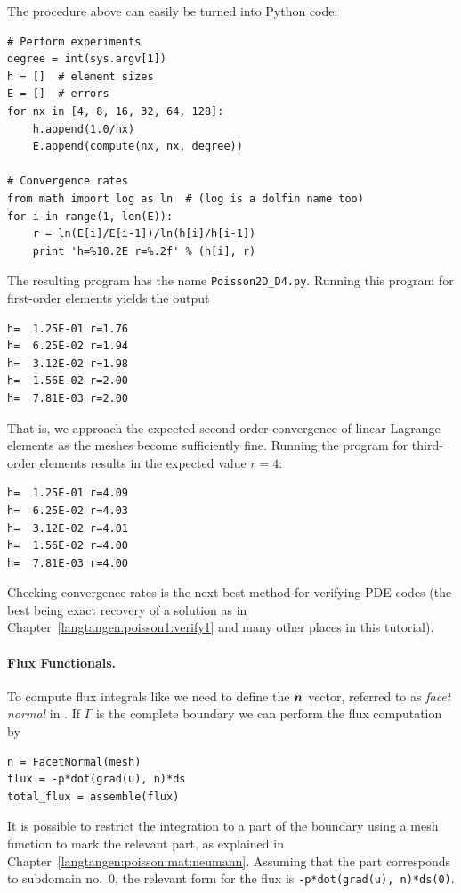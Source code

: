 The procedure above can easily be turned into Python code:
\begin{Verbatim}[fontsize=\fontsize{10pt}{10pt},tabsize=8,baselinestretch=1.05,
fontfamily=tt,xleftmargin=7mm]
# Perform experiments
degree = int(sys.argv[1])
h = []  # element sizes
E = []  # errors
for nx in [4, 8, 16, 32, 64, 128]:
    h.append(1.0/nx)
    E.append(compute(nx, nx, degree))

# Convergence rates
from math import log as ln  # (log is a dolfin name too)
for i in range(1, len(E)):
    r = ln(E[i]/E[i-1])/ln(h[i]/h[i-1])
    print 'h=%10.2E r=%.2f' % (h[i], r)
\end{Verbatim}
\noindent
The resulting program has the name {\fontsize{12pt}{12pt}\verb!Poisson2D_D4.py!}. Running this
program for first-order elements yields the output
\begin{Verbatim}[fontsize=\fontsize{10pt}{10pt},tabsize=8,baselinestretch=1.05,
fontfamily=tt,xleftmargin=7mm]
h=  1.25E-01 r=1.76
h=  6.25E-02 r=1.94
h=  3.12E-02 r=1.98
h=  1.56E-02 r=2.00
h=  7.81E-03 r=2.00
\end{Verbatim}
\noindent
That is, we approach the expected second-order convergence of linear
Lagrange elements as the meshes become sufficiently fine.
Running the program for third-order elements results in the
expected value $r=4$:
\begin{Verbatim}[fontsize=\fontsize{10pt}{10pt},tabsize=8,baselinestretch=1.05,
fontfamily=tt,xleftmargin=7mm]
h=  1.25E-01 r=4.09
h=  6.25E-02 r=4.03
h=  3.12E-02 r=4.01
h=  1.56E-02 r=4.00
h=  7.81E-03 r=4.00
\end{Verbatim}
\noindent
Checking convergence rates is the next best method for verifying PDE codes
(the best being exact recovery of a solution as in Chapter~\ref{langtangen:poisson1:verify1} and many other places in this tutorial).

\paragraph{Flux Functionals.}
To compute flux integrals like 
we need to define the ${\mbox{\boldmath $n$}}$ vector, referred to as \emph{facet normal}
in \fenics. If $\Gamma$ is the complete boundary we can perform
the flux computation by
\begin{Verbatim}[fontsize=\fontsize{10pt}{10pt},tabsize=8,baselinestretch=1.05,
fontfamily=tt,xleftmargin=7mm]
n = FacetNormal(mesh)
flux = -p*dot(grad(u), n)*ds
total_flux = assemble(flux)
\end{Verbatim}
\noindent
It is possible to restrict the integration to a part of the boundary
using a mesh function to mark the relevant part, as
explained in Chapter~\ref{langtangen:poisson:mat:neumann}. Assuming that the
part corresponds to subdomain no.~0, the relevant form for the
flux is {\fontsize{12pt}{12pt}\texttt{-p*dot(grad(u), n)*ds(0)}}.

